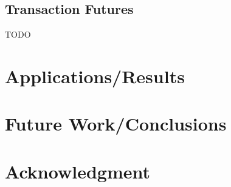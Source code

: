 \documentclass[conference]{IEEEtran}
\begin{document}
\subsection{Transaction Futures}

TODO

\section{Applications/Results}

\section{Future Work/Conclusions}

\section*{Acknowledgment}




\end{document}

